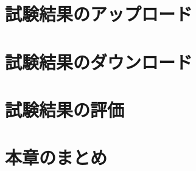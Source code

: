 \section{試験結果のアップロード}
\label{sec:upload-result}




\section{試験結果のダウンロード}
\label{sec:download-result}



\section{試験結果の評価}
\label{sec:elec-eval}





\section{本章のまとめ}
\label{sec:summary-7}



\newpage
